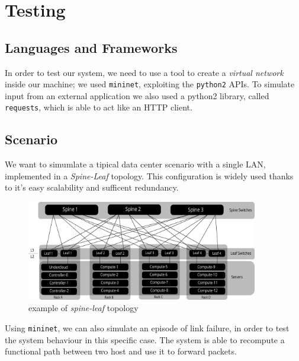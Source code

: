 \chapter{Testing}
\section*{Languages and Frameworks}
In order to test our system, we need to use a tool to create a \textit{virtual network} inside our machine; we used \texttt{mininet}, 
exploiting the \texttt{python2} APIs. To simulate input from an external application we also used a python2 library, called \texttt{requests},
which is able to act like an HTTP client.

\section{Scenario}
We want to simumlate a tipical data center scenario with a single LAN, implemented in a \textit{Spine-Leaf} topology. This configuration
is widely used thanks to it's easy scalability and sufficent redundancy.
\begin{figure}[h]
    \caption{example of \textit{spine-leaf} topology}
    \includegraphics[width=0.90\textwidth]{img/spine_leaf.pdf}
\end{figure}

Using \texttt{mininet}, we can also simulate an episode of link failure, in order to test the system behaviour in this specific case. The system is able to
recompute a functional path between two host and use it to forward packets.

